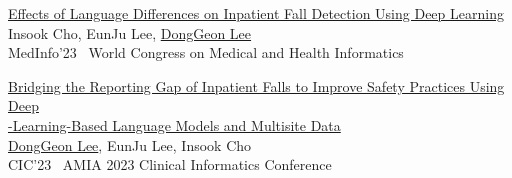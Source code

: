 \documentclass[letterpaper,11pt]{article}
\begin{document}
\begin{enumerate}[noitemsep, leftmargin=*,label={[\arabic*]},itemsep=0.6em]
        \item \href{https://pubmed.ncbi.nlm.nih.gov/38426881/}{Effects of Language Differences on Inpatient Fall Detection Using Deep Learning}\\
        Insook Cho, EunJu Lee, \underline{DongGeon Lee}\\[3pt]
        MedInfo'23 \textbar\ World Congress on Medical and Health Informatics
        
        \item \href{https://bit.ly/cic23s47}{Bridging the Reporting Gap of Inpatient Falls to Improve Safety Practices Using Deep\\-Learning-Based Language Models and Multisite Data}\\
        \underline{DongGeon Lee}, EunJu Lee, Insook Cho\\[3pt]
        CIC'23 \textbar\ AMIA 2023 Clinical Informatics Conference
    \end{enumerate}
        


        
\end{document}
